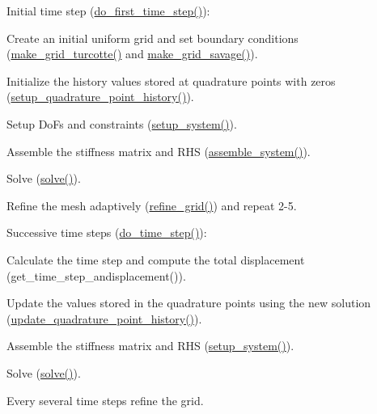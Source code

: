 \begin{DoxyItemize}
\item Initial time step (\hyperlink{classvsf_1_1ApShear_a49ba2c773ca4f6a1946dee0d08e76901}{do\-\_\-first\-\_\-time\-\_\-step()})\-:
\begin{DoxyEnumerate}
\item Create an initial uniform grid and set boundary conditions (\hyperlink{classvsf_1_1ApShear_ab12b87e8d50262d7735c5ba0aab1549f}{make\-\_\-grid\-\_\-turcotte()} and \hyperlink{classvsf_1_1ApShear_a265e55ba004056c96ab59aa633d5510f}{make\-\_\-grid\-\_\-savage()}).
\item Initialize the history values stored at quadrature points with zeros (\hyperlink{classvsf_1_1ApShear_a7e74ebe08f8b6586a71c606a64ab4db4}{setup\-\_\-quadrature\-\_\-point\-\_\-history()}).
\item Setup Do\-Fs and constraints (\hyperlink{classvsf_1_1ApShear_aa64a11292b5664242bb982a1a400fae0}{setup\-\_\-system()}).
\item Assemble the stiffness matrix and R\-H\-S (\hyperlink{classvsf_1_1ApShear_a53c9284a86fc90a817ddad24eaf18569}{assemble\-\_\-system()}).
\item Solve (\hyperlink{classvsf_1_1ApShear_a7e90fa26f6c78252f8e4592d5fc7adcf}{solve()}).
\item Refine the mesh adaptively (\hyperlink{classvsf_1_1ApShear_ae0c1413d01e98526e4a61a7324bf2ae0}{refine\-\_\-grid()}) and repeat 2-\/5.
\end{DoxyEnumerate}
\item Successive time steps (\hyperlink{classvsf_1_1ApShear_a230bde382d9f71b56181ae943634611e}{do\-\_\-time\-\_\-step()})\-:
\begin{DoxyEnumerate}
\item Calculate the time step and compute the total displacement (get\-\_\-time\-\_\-step\-\_\-andisplacement()).
\item Update the values stored in the quadrature points using the new solution (\hyperlink{classvsf_1_1ApShear_a6b2acd54f930d5deac94064923e1aa7b}{update\-\_\-quadrature\-\_\-point\-\_\-history()}).
\item Assemble the stiffness matrix and R\-H\-S (\hyperlink{classvsf_1_1ApShear_aa64a11292b5664242bb982a1a400fae0}{setup\-\_\-system()}).
\item Solve (\hyperlink{classvsf_1_1ApShear_a7e90fa26f6c78252f8e4592d5fc7adcf}{solve()}).
\item Every several time steps refine the grid.
\begin{DoxyItemize}

\end{DoxyItemize}
\end{DoxyEnumerate}
\end{DoxyItemize}
